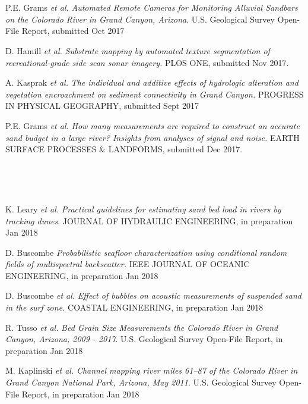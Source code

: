 \documentclass{article} %
\def\sf{\sffamily}
\def\sl{\slshape}
\newlength\sidebarwidth
\newcommand{\subtopic}[3][]
	 {\begin{minipage}{\textwidth}
	 \vspace*{.4\baselineskip}
         \nopagebreak\hspace{0in}%
         \nopagebreak\begin{minipage}[t]{\sidebarwidth - .2cm}
         \raggedleft {\sf\fontseries{sbc}\selectfont #2}
         {\\[-0.2\baselineskip] \textcolor{gray}{\footnotesize #1}}
	 \end{minipage}%
	 \hfill
	 \begin{minipage}[t]{\linewidth - \sidebarwidth}
	 #3%
	 \end{minipage}%
	 \vspace*{.2\baselineskip plus 1\baselineskip minus
	 .2\baselineskip}%
	 \end{minipage}}
\begin{document}
\subtopic{\hspace*{-3ex} In Review}{~
  \begin{itemize}[leftmargin=0ex, itemsep=0ex, parsep=.5ex, labelindent=-4ex]

    \publication
      P.E. Grams {\sl et al.}
      {\sl Automated Remote Cameras for Monitoring Alluvial Sandbars on the Colorado River in Grand Canyon, Arizona}.
      U.S. Geological Survey Open-File Report, submitted Oct 2017

    \publication
      D. Hamill {\sl et al.}
      {\sl Substrate mapping by automated texture segmentation of recreational-grade side scan sonar imagery.}
      PLOS ONE, submitted Nov 2017.

    \publication
      A. Kasprak {\sl et al.}
      {\sl The individual and additive effects of hydrologic alteration and vegetation encroachment on sediment connectivity in Grand Canyon.}
      PROGRESS IN PHYSICAL GEOGRAPHY, submitted Sept 2017

    \publication
      P.E. Grams {\sl et al.}
      {\sl How many measurements are required to construct an accurate sand budget in a large river? Insights from analyses of signal and noise.}
      EARTH SURFACE PROCESSES \& LANDFORMS, submitted Dec 2017.

    \end{itemize}
}

\subtopic{\hspace*{-3ex} Forthcoming}{~
  \begin{itemize}[leftmargin=0ex, itemsep=0ex, parsep=.5ex, labelindent=-4ex]

    \publication
      K. Leary {\sl et al.}
      {\sl Practical guidelines for estimating sand bed load in rivers by tracking dunes}.
      JOURNAL OF HYDRAULIC ENGINEERING, in preparation Jan 2018

    \publication
      D. Buscombe 
      {\sl Probabilistic seafloor characterization using conditional random fields of multispectral backscatter.}
      IEEE JOURNAL OF OCEANIC ENGINEERING, in preparation Jan 2018

    \publication
      D. Buscombe {\sl et al.}
      {\sl Effect of bubbles on acoustic measurements of suspended sand in the surf zone.}
      COASTAL ENGINEERING, in preparation Jan 2018

    \publication
      R. Tusso {\sl et al.}
      {\sl Bed Grain Size Measurements the Colorado River in Grand Canyon, Arizona, 2009 - 2017}.
      U.S. Geological Survey Open-File Report, in preparation Jan 2018

    \publication
      M. Kaplinski {\sl et al.}
      {\sl Channel mapping river miles 61–87 of the Colorado River in Grand Canyon National Park, Arizona, May 2011}.
      U.S. Geological Survey Open-File Report, in preparation Jan 2018

    \end{itemize}
}
\end{document}
